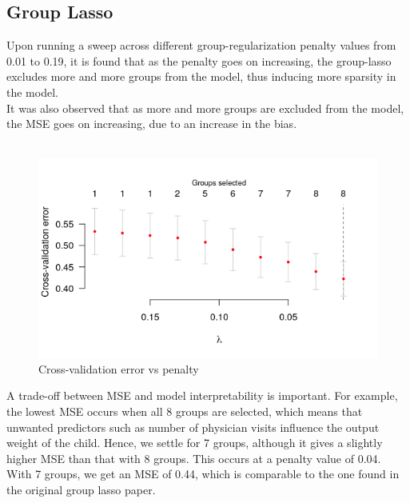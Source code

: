 \documentclass[a4paper,12pt]{article}
\begin{document}
		\subsection{Group Lasso}
Upon running a sweep across different group-regularization penalty values from 0.01 to 0.19, it is found that as the penalty goes on increasing, the group-lasso excludes more and more groups from the model, thus inducing more sparsity in the model. \\
It was also observed that as more and more groups are excluded from the model, the MSE goes on increasing, due to an increase in the bias. \\
\\
\begin{figure}[H]
 \centering
 \includegraphics[scale=0.8]{err-lambda.png}
  \caption{Cross-validation error vs penalty}
  \label{fig:neurons}
\end{figure}
A trade-off between MSE and model interpretability is important. For example, the lowest MSE occurs when all 8 groups are selected, which means that unwanted predictors such as {number of physician visits} influence the output {weight of the child}. Hence, we settle for 7 groups, although it gives a slightly higher MSE than that with 8 groups. This occurs at a penalty value of 0.04. With 7 groups, we get an MSE of 0.44, which is comparable to the one found in the original group lasso paper. 
\end{document}
